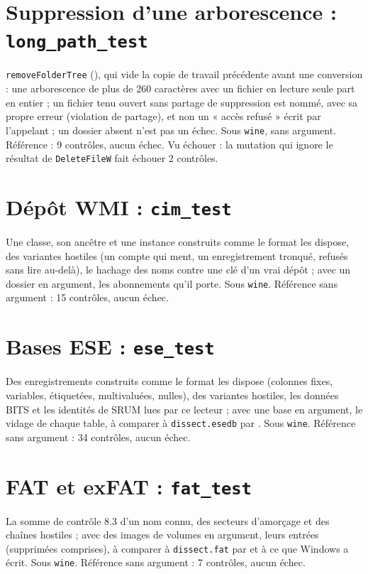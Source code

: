 \documentclass[11pt,a4paper,oneside]{report}
\begin{document}
\section{Suppression d'une arborescence : \texttt{long\_path\_test}}

\texttt{removeFolderTree} (), qui vide la copie de travail
précédente avant une conversion : une arborescence de plus de 260 caractères
avec un fichier en lecture seule part en entier ; un fichier tenu ouvert sans
partage de suppression est nommé, avec sa propre erreur (violation de partage),
et non un « accès refusé » écrit par l'appelant ; un dossier absent n'est pas un
échec. Sous \texttt{wine}, sans argument. Référence : 9 contrôles, aucun échec.
Vu échouer : la mutation qui ignore le résultat de \texttt{DeleteFileW} fait
échouer 2 contrôles.

\section{Dépôt WMI : \texttt{cim\_test}}

Une classe, son ancêtre et une instance construits comme le format les dispose,
des variantes hostiles (un compte qui ment, un enregistrement tronqué, refusés
sans lire au-delà), le hachage des noms contre une clé d'un vrai dépôt ; avec un
dossier  en argument, les abonnements qu'il porte. Sous
\texttt{wine}. Référence sans argument : 15 contrôles, aucun échec.

\section{Bases ESE : \texttt{ese\_test}}

Des enregistrements construits comme le format les dispose (colonnes fixes,
variables, étiquetées, multivaluées, nulles), des variantes hostiles, les
données BITS et les identités de SRUM lues par ce lecteur ; avec une base en
argument, le vidage de chaque table, à comparer à \texttt{dissect.esedb} par
. Sous \texttt{wine}. Référence sans
argument : 34 contrôles, aucun échec.

\section{FAT et exFAT : \texttt{fat\_test}}

La somme de contrôle 8.3 d'un nom connu, des secteurs d'amorçage et des chaînes
hostiles ; avec des images de volumes en argument, leurs entrées (supprimées
comprises), à comparer à \texttt{dissect.fat} par
 et à ce que Windows a écrit. Sous
\texttt{wine}. Référence sans argument : 7 contrôles, aucun échec.
\end{document}

